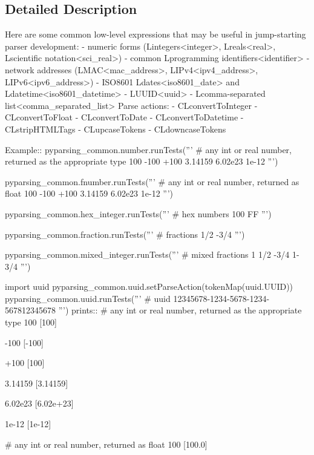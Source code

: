 \subsection{Detailed Description}
\begin{DoxyVerb}Here are some common low-level expressions that may be useful in jump-starting parser development:
 - numeric forms (L{integers<integer>}, L{reals<real>}, L{scientific notation<sci_real>})
 - common L{programming identifiers<identifier>}
 - network addresses (L{MAC<mac_address>}, L{IPv4<ipv4_address>}, L{IPv6<ipv6_address>})
 - ISO8601 L{dates<iso8601_date>} and L{datetime<iso8601_datetime>}
 - L{UUID<uuid>}
 - L{comma-separated list<comma_separated_list>}
Parse actions:
 - C{L{convertToInteger}}
 - C{L{convertToFloat}}
 - C{L{convertToDate}}
 - C{L{convertToDatetime}}
 - C{L{stripHTMLTags}}
 - C{L{upcaseTokens}}
 - C{L{downcaseTokens}}

Example::
    pyparsing_common.number.runTests('''
        # any int or real number, returned as the appropriate type
        100
        -100
        +100
        3.14159
        6.02e23
        1e-12
        ''')

    pyparsing_common.fnumber.runTests('''
        # any int or real number, returned as float
        100
        -100
        +100
        3.14159
        6.02e23
        1e-12
        ''')

    pyparsing_common.hex_integer.runTests('''
        # hex numbers
        100
        FF
        ''')

    pyparsing_common.fraction.runTests('''
        # fractions
        1/2
        -3/4
        ''')

    pyparsing_common.mixed_integer.runTests('''
        # mixed fractions
        1
        1/2
        -3/4
        1-3/4
        ''')

    import uuid
    pyparsing_common.uuid.setParseAction(tokenMap(uuid.UUID))
    pyparsing_common.uuid.runTests('''
        # uuid
        12345678-1234-5678-1234-567812345678
        ''')
prints::
    # any int or real number, returned as the appropriate type
    100
    [100]

    -100
    [-100]

    +100
    [100]

    3.14159
    [3.14159]

    6.02e23
    [6.02e+23]

    1e-12
    [1e-12]

    # any int or real number, returned as float
    100
    [100.0]


\end{DoxyVerb}
